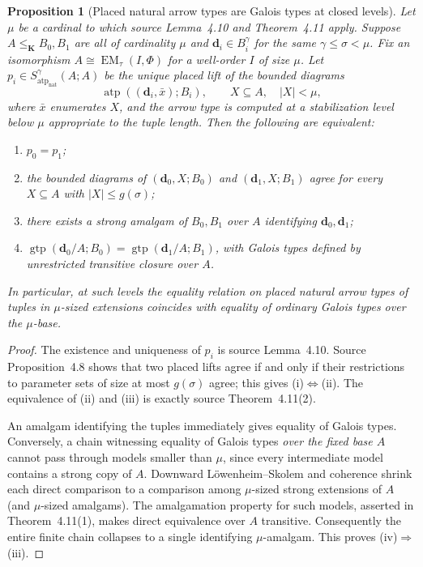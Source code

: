 \documentclass[11pt]{article}
\newcommand{\K}{\mathbf K}
\newcommand{\atp}{\operatorname{atp}}
\newcommand{\natatp}{\operatorname{atp}_{\mathrm{nat}}}
\newcommand{\gtp}{\operatorname{gtp}}
\newcommand{\EM}{\operatorname{EM}_{\tau}}
\newcommand{\bd}{\mathbf{d}}
\theoremstyle{plain}
\newtheorem{proposition}[definition]{Proposition}
\begin{document}
\begin{proposition}[Placed natural arrow types are Galois types at closed levels]
\label{prop:closed-level-gtp-characterization}
Let $\mu$ be a cardinal to which source
Lemma~4.10 and Theorem~4.11 apply.
Suppose $A\leq_\K B_0,B_1$ are all of
cardinality $\mu$ and $\bd_i\in B_i^\gamma$
for the same $\gamma\leq\sigma<\mu$.
Fix an isomorphism $A\cong\EM(I,\Phi)$
for a well-order $I$ of size $\mu$.
Let $p_i\in S^\gamma_{\natatp}(A;A)$
be the \emph{unique placed lift} of the
bounded diagrams
\[
\atp((\bd_i,\bar x);B_i),
\qquad X\subseteq A,\quad
|X|<\mu,
\]
where $\bar x$ enumerates $X$,
and the arrow type is computed at a
stabilization level below $\mu$
appropriate to the tuple length.
Then the following are equivalent:
\begin{enumerate}[label=\textup{(\roman*)}]
\item $p_0=p_1$;
\item the bounded diagrams of
$(\bd_0,X;B_0)$ and
$(\bd_1,X;B_1)$ agree for every
$X\subseteq A$ with $|X|\leq g(\sigma)$;
\item there exists a strong amalgam
of $B_0,B_1$ over $A$ identifying
$\bd_0,\bd_1$;
\item $\gtp(\bd_0/A;B_0)=\gtp(\bd_1/A;B_1)$,
with Galois types defined by unrestricted
transitive closure over $A$.
\end{enumerate}
In particular, at such levels the equality
relation on placed natural arrow types
of tuples in $\mu$-sized extensions
\emph{coincides with} equality of
ordinary Galois types over the $\mu$-base.
\end{proposition}
\begin{proof}
The existence and uniqueness of $p_i$
is source Lemma~4.10. Source Proposition~4.8
shows that two placed lifts agree if and
only if their restrictions to parameter
sets of size at most $g(\sigma)$ agree;
this gives (i)$\Leftrightarrow$(ii).
The equivalence of (ii) and (iii) is
exactly source Theorem~4.11(2).

An amalgam identifying the tuples immediately
gives equality of Galois types. Conversely,
a chain witnessing equality of Galois types
\emph{over the fixed base $A$} cannot pass
through models smaller than $\mu$, since
every intermediate model contains a strong
copy of $A$. Downward L\"owenheim--Skolem
and coherence shrink each direct comparison
to a comparison among $\mu$-sized strong
extensions of $A$ (and $\mu$-sized amalgams).
The amalgamation property for such models,
asserted in Theorem~4.11(1), makes direct
equivalence over $A$ transitive.
Consequently the entire finite chain
collapses to a single identifying
$\mu$-amalgam. This proves
(iv)$\Rightarrow$(iii).
\end{proof}
\end{document}
